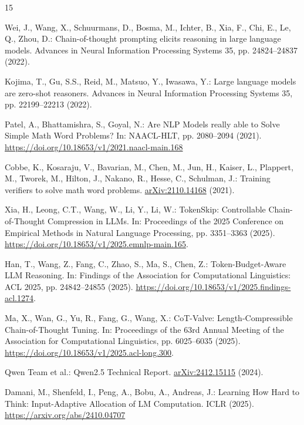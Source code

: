 \documentclass[a4paper,runningheads]{llncs}
\begin{document}
\begin{thebibliography}{15}

Wei, J., Wang, X., Schuurmans, D., Bosma, M., Ichter, B., Xia, F., Chi, E.,
Le, Q., Zhou, D.: Chain-of-thought prompting elicits reasoning in large
language models. Advances in Neural Information Processing Systems 35, pp. 24824--24837 (2022).


Kojima, T., Gu, S.S., Reid, M., Matsuo, Y., Iwasawa, Y.: Large language
models are zero-shot reasoners. Advances in Neural Information Processing
Systems 35, pp. 22199--22213 (2022).


Patel, A., Bhattamishra, S., Goyal, N.: Are NLP Models really able to Solve Simple Math Word Problems? In: NAACL-HLT, pp. 2080--2094 (2021). \url{https://doi.org/10.18653/v1/2021.naacl-main.168}

Cobbe, K., Kosaraju, V., Bavarian, M., Chen, M., Jun, H., Kaiser, L.,
Plappert, M., Tworek, M., Hilton, J., Nakano, R., Hesse, C., Schulman, J.:
Training verifiers to solve math word problems. \href{https://arxiv.org/abs/2110.14168}{arXiv:2110.14168} (2021).

Xia, H., Leong, C.T., Wang, W., Li, Y., Li, W.: TokenSkip: Controllable
Chain-of-Thought Compression in LLMs. In: Proceedings of the 2025 Conference
on Empirical Methods in Natural Language Processing, pp. 3351--3363 (2025).
\url{https://doi.org/10.18653/v1/2025.emnlp-main.165}.

Han, T., Wang, Z., Fang, C., Zhao, S., Ma, S., Chen, Z.: Token-Budget-Aware
LLM Reasoning. In: Findings of the Association for Computational Linguistics:
ACL 2025, pp. 24842--24855 (2025).
\url{https://doi.org/10.18653/v1/2025.findings-acl.1274}.

Ma, X., Wan, G., Yu, R., Fang, G., Wang, X.: CoT-Valve: Length-Compressible
Chain-of-Thought Tuning. In: Proceedings of the 63rd Annual Meeting of the
Association for Computational Linguistics, pp. 6025--6035 (2025).
\url{https://doi.org/10.18653/v1/2025.acl-long.300}.

Qwen Team et al.: Qwen2.5 Technical Report. \href{https://arxiv.org/abs/2412.15115}{arXiv:2412.15115} (2024).

Damani, M., Shenfeld, I., Peng, A., Bobu, A., Andreas, J.: Learning How Hard to Think: Input-Adaptive Allocation of LM Computation. ICLR (2025). \url{https://arxiv.org/abs/2410.04707}


\end{thebibliography}
\end{document}
